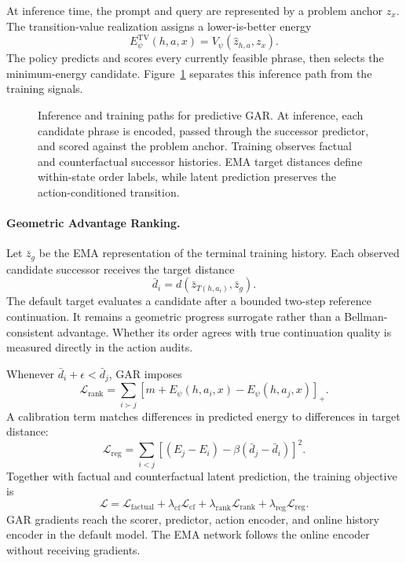 At inference time, the prompt and query are represented by a problem anchor $z_x$. The transition-value realization assigns a lower-is-better energy
\begin{equation}
    E^{\mathrm{TV}}_\psi(h,a,x)=V_\psi(\widehat z_{h,a},z_x).
\end{equation}
The policy predicts and scores every currently feasible phrase, then selects the minimum-energy candidate. Figure~\ref{fig:method} separates this inference path from the training signals.

\begin{figure}[t]
    \centering
    \resizebox{0.96\linewidth}{!}{}
    \caption{Inference and training paths for predictive GAR. At inference, each candidate phrase is encoded, passed through the successor predictor, and scored against the problem anchor. Training observes factual and counterfactual successor histories. EMA target distances define within-state order labels, while latent prediction preserves the action-conditioned transition.}
    \label{fig:method}
\end{figure}

\paragraph{Geometric Advantage Ranking.}
Let $\bar z_g$ be the EMA representation of the terminal training history. Each observed candidate successor receives the target distance
\begin{equation}
    \bar d_i=d(\bar z_{T(h,a_i)},\bar z_g).
\end{equation}
The default target evaluates a candidate after a bounded two-step reference continuation. It remains a geometric progress surrogate rather than a Bellman-consistent advantage. Whether its order agrees with true continuation quality is measured directly in the action audits.

Whenever $\bar d_i+\epsilon<\bar d_j$, GAR imposes
\begin{equation}
    \mathcal{L}_{\mathrm{rank}}
    =\sum_{i\succ j}\left[m+E_\psi(h,a_i,x)-E_\psi(h,a_j,x)\right]_+.
\end{equation}
A calibration term matches differences in predicted energy to differences in target distance:
\begin{equation}
    \mathcal{L}_{\mathrm{reg}}
    =\sum_{i<j}\left[(E_j-E_i)-\beta(\bar d_j-\bar d_i)\right]^2.
\end{equation}
Together with factual and counterfactual latent prediction, the training objective is
\begin{equation}
    \mathcal{L}=\mathcal{L}_{\mathrm{factual}}
    +\lambda_{\mathrm{cf}}\mathcal{L}_{\mathrm{cf}}
    +\lambda_{\mathrm{rank}}\mathcal{L}_{\mathrm{rank}}
    +\lambda_{\mathrm{reg}}\mathcal{L}_{\mathrm{reg}}.
\end{equation}
GAR gradients reach the scorer, predictor, action encoder, and online history encoder in the default model. The EMA network follows the online encoder without receiving gradients.

